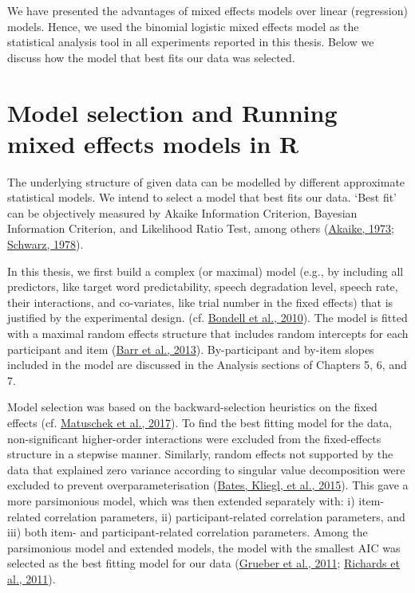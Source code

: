 \documentclass[a4paper, nobind]{templates/ociamthesis}
\begin{document}
We have presented the advantages of mixed effects models over linear (regression) models.
Hence, we used the binomial logistic mixed effects model as the statistical analysis tool in all experiments reported in this thesis.
Below we discuss how the model that best fits our data was selected.

\hypertarget{analysis-main}{%
\section{Model selection and Running mixed effects models in R}\label{analysis-main}}

The underlying structure of given data can be modelled by different approximate statistical models.
We intend to select a model that best fits our data.
`Best fit' can be objectively measured by Akaike Information Criterion, Bayesian Information Criterion, and Likelihood Ratio Test, among others (\protect\hyperlink{ref-Akaike1973}{Akaike, 1973}; \protect\hyperlink{ref-Schwarz1978}{Schwarz, 1978}).

In this thesis, we first build a complex (or maximal) model
(e.g., by including all predictors, like target word predictability, speech degradation level, speech rate, their interactions, and co-variates, like trial number in the fixed effects)
that is justified by the experimental design. (cf. \protect\hyperlink{ref-Bondell2010}{Bondell et al., 2010}).
The model is fitted with a maximal random effects structure that includes random intercepts for each participant and item (\protect\hyperlink{ref-Barr2013}{Barr et al., 2013}).
By-participant and by-item slopes included in the model are discussed in the Analysis sections of Chapters 5, 6, and 7.

Model selection was based on the backward-selection heuristics on the fixed effects (cf. \protect\hyperlink{ref-Matuschek2017}{Matuschek et al., 2017}).
To find the best fitting model for the data,
non-significant higher-order interactions were excluded from the fixed-effects structure in a stepwise manner.
Similarly, random effects not supported by the data that explained zero variance according to singular value decomposition were excluded to prevent overparameterisation (\protect\hyperlink{ref-Bates2015a}{Bates, Kliegl, et al., 2015}).
This gave a more parsimonious model, which was then extended separately with: i) item-related correlation parameters, ii) participant-related correlation parameters, and iii) both item- and participant-related correlation parameters.
Among the parsimonious model and extended models,
the model with the smallest AIC was selected as the best fitting model for our data (\protect\hyperlink{ref-Grueber2011}{Grueber et al., 2011}; \protect\hyperlink{ref-Richards2011}{Richards et al., 2011}).
\end{document}
